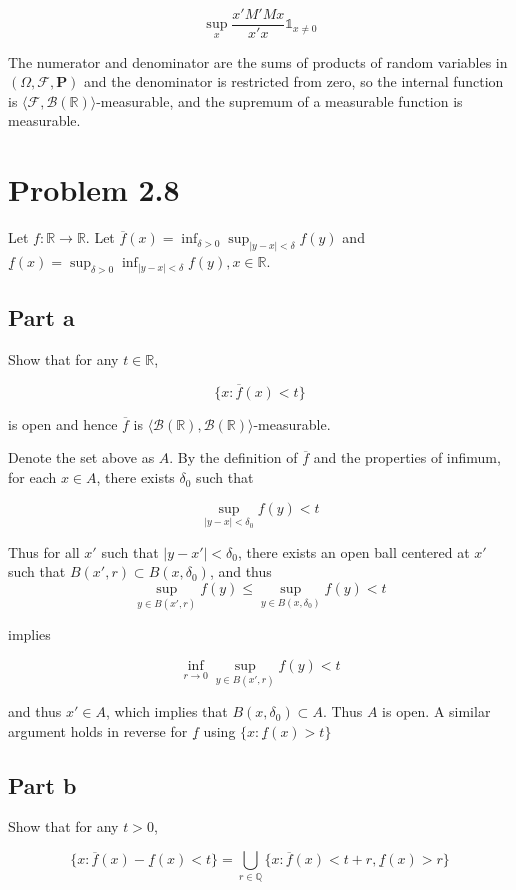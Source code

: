 \documentclass{article}
\newcommand{\R}{\mathbb{R}}
\newcommand{\Q}{\mathbb{Q}}
\newcommand{\F}{\mathcal{F}}
\newcommand{\B}{\mathcal{B}}
\newcommand{\prob}{\boldsymbol{P}}
\begin{document}
\[
\sup_{x} \frac{x'M'Mx}{x'x}\mathds{1}_{x \neq 0}
\]

The numerator and denominator are the sums of products of random variables in $(\Omega, \F, \prob)$ and the denominator is restricted from zero, so the internal function is $\langle \F, \B(\R) \rangle$-measurable, and the supremum of a measurable function is measurable.

\section*{Problem 2.8}

Let $f: \R \rightarrow \R$. Let $\overline{f}(x) = \inf_{\delta > 0} \sup_{|y-x|<\delta} f(y)$ and $\underline{f}(x) = \sup_{\delta > 0} \inf_{|y-x|<\delta} f(y), x \in \R$.

\subsection*{Part a}

Show that for any $t \in \R$,

\[
\{ x: \overline{f}(x)<t \}
\]

is open and hence $\overline{f}$ is $\langle \B(\R), \B(\R) \rangle$-measurable.

Denote the set above as $A$. By the definition of $\overline{f}$ and the properties of infimum, for each $x \in A$, there exists $\delta_0$ such that

\[
\sup_{|y-x|<\delta_0} f(y) < t
\]

Thus for all $x'$ such that $|y-x'| < \delta_0$, there exists an open ball centered at $x'$ such that $B(x', r) \subset B(x, \delta_0)$, and thus
\[
\sup_{y \in B(x', r)} f(y) \leq \sup_{y \in B(x, \delta_0)} f(y) < t
\]

implies

\[
\inf_{r \rightarrow 0} \sup_{y \in B(x', r)} f(y) < t
\]

and thus $x' \in A$, which implies that $B(x, \delta_0) \subset A$. Thus $A$ is open. A similar argument holds in reverse for $\underline{f}$ using $\{ x: \underline{f}(x)>t \}$

\subsection*{Part b}

Show that for any $t > 0$,

\[
\{ x: \overline{f}(x) - \underline{f}(x) < t \} = \bigcup_{r \in \Q}\{ x: \overline{f}(x)<t+r, \underline{f}(x) > r \}
\]
\end{document}
